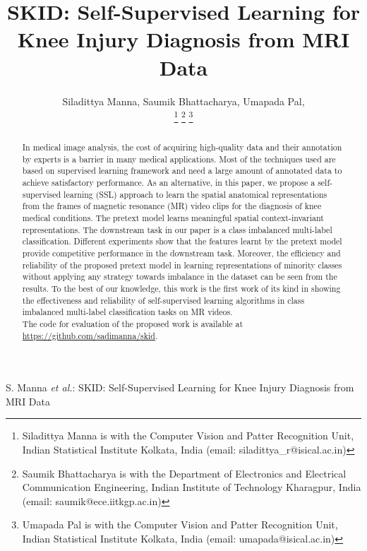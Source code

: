 \documentclass[journal]{IEEEtai}
\begin{document}
\title{SKID: Self-Supervised Learning for Knee Injury Diagnosis from MRI Data}
\author{Siladittya Manna, Saumik Bhattacharya, Umapada Pal, 

\thanks{Siladittya Manna is with the Computer Vision and Patter Recognition Unit, Indian Statistical Institute Kolkata, India (email: siladittya\_r@isical.ac.in)}
\thanks{Saumik Bhattacharya is with the Department of Electronics and Electrical Communication Engineering, Indian Institute of Technology Kharagpur, India (email: saumik@ece.iitkgp.ac.in)}
\thanks{Umapada Pal is with the Computer Vision and Patter Recognition Unit, Indian Statistical Institute Kolkata, India (email: umapada@isical.ac.in)}
}

{S. Manna \MakeLowercase{\textit{et al.}}: SKID: Self-Supervised Learning for Knee Injury Diagnosis from MRI Data}


\maketitle

\begin{abstract}
In medical image analysis, the cost of acquiring high-quality data and their annotation by experts is a barrier in many medical applications. Most of the techniques used are based on supervised learning framework and need a large amount of annotated data to achieve satisfactory performance. As an alternative, in this paper, we propose a self-supervised learning (SSL) approach to learn the spatial anatomical representations from the frames of magnetic resonance (MR) video clips for the diagnosis of knee medical conditions. The pretext model learns meaningful spatial context-invariant representations. The downstream task in our paper is a class imbalanced multi-label classification. Different experiments show that the features learnt by the pretext model provide competitive performance in the downstream task. Moreover, the efficiency and reliability of the proposed pretext model in learning representations of minority classes without applying any strategy towards imbalance in the dataset can be seen from the results. To the best of our knowledge, this work is the first work of its kind in showing the effectiveness and reliability of self-supervised learning algorithms in class imbalanced multi-label classification tasks on MR videos.\\
   \indent The code for evaluation of the proposed work is available at \\ \href{https://github.com/sadimanna/skid}{\selectfont https://github.com/sadimanna/skid}.
\end{abstract}
\end{document}
